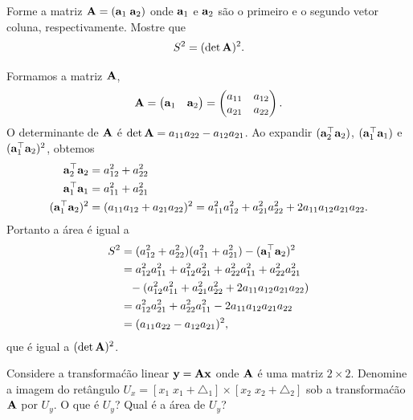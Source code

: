 \begin{exenumerate}
\begin{solution}
    \end{solution}
    
    \item Forme a matriz $\mathbf{A}=(\mathbf{a}_1 \; \mathbf{a}_2)$ onde $\mathbf{a}_1$ e $\mathbf{a}_2$ s\~ao
    o primeiro e o segundo vetor coluna, respectivamente. Mostre que
    \begin{equation}
        S^2 = (\det \mathbf{A})^2.
    \end{equation}
    
    
    \begin{solution}
        Formamos a matriz $\mathbf{A}$,
        \begin{equation}
            \mathbf{A} = \begin{pmatrix} \mathbf{a}_1 & \mathbf{a}_2
            \end{pmatrix}  =
            \begin{pmatrix} a_{11} & a_{12} \\ a_{21} & a_{22}
            \end{pmatrix}.
        \end{equation}
        O determinante de $\mathbf{A}$ \'e $\det \mathbf{A} = a_{11}a_{22} - a_{12}a_{21}$. Ao expandir $(\mathbf{a}_2^\top\mathbf{a}_2)$, $(\mathbf{a}_1^\top\mathbf{a}_1)$ e 
        $(\mathbf{a}_1^\top\mathbf{a}_2)^2$, obtemos
        \begin{align}
            \mathbf{a}_2^\top\mathbf{a}_2   &= a_{12}^2 + a_{22}^2 \\ 
            \mathbf{a}_1^\top\mathbf{a}_1   &= a_{11}^2 + a_{21}^2 \\
            (\mathbf{a}_1^\top\mathbf{a}_2)^2   &= (a_{11}a_{12} + a_{21}a_{22})^2 = a_{11}^2a_{12}^2 + a_{21}^2a_{22}^2 + 2a_{11}a_{12}a_{21}a_{22}.
        \end{align}
        Portanto a \'area \'e igual a
        \begin{align}
            S^2 &= (a_{12}^2 + a_{22}^2)(a_{11}^2 + a_{21}^2) - (\mathbf{a}_1^\top\mathbf{a}_2)^2 \\
            &= a_{12}^2a_{11}^2 + a_{12}^2a_{21}^2 + a_{22}^2a_{11}^2 + a_{22}^2a_{21}^2 \nonumber\\
            &\phantom{=}- (a_{12}^2a_{11}^2 + a_{21}^2a_{22}^2 + 2a_{11}a_{12}a_{21}a_{22}) \\
            &= a_{12}^2a_{21}^2 + a_{22}^2a_{11}^2 - 2a_{11}a_{12}a_{21}a_{22} \\
            &= (a_{11}a_{22} - a_{12}a_{21})^2,
        \end{align}
        que \'e igual a $(\det \mathbf{A})^2$.
    \end{solution}
    \item Considere a transforma\'c\~ao linear $\mathbf{y}=\mathbf{A}\mathbf{x}$ onde $\mathbf{A}$
    \'e uma matriz $2 \times 2$. Denomine a imagem do ret\^angulo $U_x=[x_1 \;
    x_1+\triangle_1]\times [x_2 \; x_2+\triangle_2]$ sob a transforma\'c\~ao
    $\mathbf{A}$ por $U_y$. O que \'e $U_y$? Qual \'e a \'area de $U_y$?
    

\end{exenumerate}
